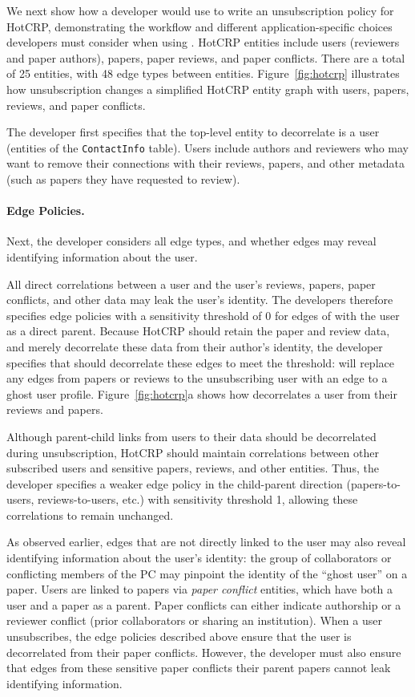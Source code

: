 We next show how a developer would use \sys to write an unsubscription policy for
HotCRP, demonstrating the workflow and different application-specific choices developers must
consider when using \sys.
HotCRP entities include users (reviewers and paper authors), papers, paper reviews, and paper
conflicts. There are a total of 25 entities, with 48 edge types between entities.
Figure~\ref{fig:hotcrp} illustrates how unsubscription changes a simplified HotCRP entity graph with
users, papers, reviews, and paper conflicts.

The developer first specifies that the top-level entity to decorrelate is a user (entities of the
\texttt{ContactInfo} table). Users include authors and reviewers who may want to remove their
connections with their reviews, papers, and other metadata (such as papers they have requested to
review).

\paragraph{Edge Policies.}
Next, the developer considers all edge types, and whether edges may reveal identifying information
about the user.

All direct correlations between a user and the user's reviews, papers, paper conflicts, and other
data may leak the user's identity. The developers therefore specifies edge policies with a
sensitivity threshold of 0 for edges of with the user as a direct parent.  Because HotCRP should
retain the paper and review data, and merely decorrelate these data from their author's identity,
the developer specifies that \sys should decorrelate these edges to meet the threshold: \sys will
replace any edges from papers or reviews to the unsubscribing user with an edge to a ghost user
profile. Figure~\ref{fig:hotcrp}a shows how \sys decorrelates a user from
their reviews and papers.

Although parent-child links from users to their data should be decorrelated during unsubscription,
HotCRP should maintain correlations between other subscribed users and sensitive papers, reviews,
and other entities. Thus, the developer specifies a weaker edge policy in the child-parent
direction (papers-to-users, reviews-to-users, etc.) with sensitivity threshold 1, allowing these
correlations to remain unchanged.

As observed earlier, edges that are not directly linked to the user may also reveal identifying
information about the user's identity: the group of collaborators or conflicting members of the PC
may pinpoint the identity of the ``ghost user'' on a paper. Users are linked to papers via
\emph{paper conflict} entities, which have both a user and a paper as a parent.  Paper conflicts can
either indicate authorship or a reviewer conflict (prior collaborators or sharing an institution).
When a user unsubscribes, the edge policies described above ensure that the user is decorrelated from
their paper conflicts. However, the developer must also ensure that edges from these sensitive paper
conflicts their parent papers cannot leak identifying information.

